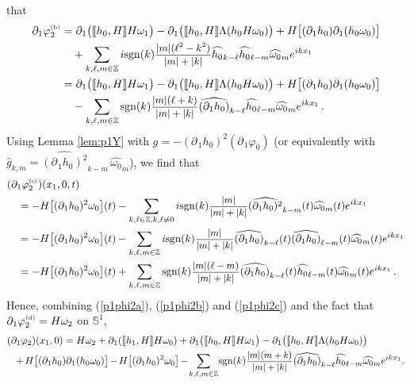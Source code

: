 \documentclass[11pt]{article}
\theoremstyle{plain}
\theoremstyle{definition}
\theoremstyle{definition}
\def\bbZ{{\mathbb Z}}
\def\p{\text{\bf\emph{p}}}
\def\ft #1{{\widehat{#1}}}
\def\p{{\partial\hspace{1pt}}}
\def\comm#1#2{{\llbracket#1,#2\rrbracket}}
\def\smallexp#1{{\text{\small #1}}}
\def\dfrac#1#2{\smallexp{$\displaystyle{}\frac{#1}{#2}$}}
\begin{document}
 that
\begin{align}
\p_{\!1} \varphi_2^{\text{\tiny(b)}} &= \p_{\!1} \big(\comm{h_0}{H} H\omega_1\big) - \p_{\!1} \big(\comm{h_0}{H} \Lambda (h_0 H \omega_0)\big) + H \big[(\p_{\!1} h_0) \p_{\!1}(h_0 \omega_0)\big] \nonumber\\
&\quad + \sum_{k,\ell,m\in\bbZ} i \text{sgn}(k) \dfrac{|m| (\ell^2 - k^2)}{|m|+|k|} \ft{h_0}_{k-\ell} \ft{h_0}_{\ell-m} \ft{\omega_0}_m e^{ikx_1} \nonumber\\
&= \p_{\!1} \big(\comm{h_0}{H} H\omega_1\big) - \p_{\!1} \big(\comm{h_0}{H} \Lambda (h_0 H \omega_0)\big) + H \big[(\p_{\!1} h_0) \p_{\!1}(h_0 \omega_0)\big] \nonumber\\
&\quad - \sum_{k,\ell,m\in\bbZ} \text{sgn}(k) \dfrac{|m| (\ell+k)}{|m|+|k|} \ft{(\p_{\!1} h_0)}_{k-\ell} \ft{h_0}_{\ell-m} \ft{\omega_0}_m e^{ikx_1} \,. \label{p1phi2b}
\end{align}
Using Lemma \ref{lem:p1Y} with $g = - (\p_{\!1} h_0)^2(\p_{\!1}\varphi_0)$ (or equivalently with  $\ft{g}_{k,m} = \ft{(\p_{\!1}h_0)^2}_{k-m}\, \ft{\omega_0}_m$), we find that
\begin{align}
& (\p_{\!1} \varphi_2^{\text{\tiny(c)}})(x_1,0,t) \nonumber\\
&\quad = - H \big[(\p_{\!1}h_0)^2 \omega_0\big](t) - \sum_{k,\ell\in\bbZ, k,\ell\ne 0} i \text{\rm sgn}(k) \dfrac{|m|}{|m|+|k|} \ft{(\p_{\!1}h_0)^2}_{k-m}(t) \ft{\omega_0}_m(t) e^{ikx_1} \nonumber\\
&\quad = - H \big[(\p_{\!1}h_0)^2 \omega_0\big](t) - \sum_{k,\ell,m\in\bbZ} i \text{\rm sgn}(k) \dfrac{|m|}{|m|+|k|} \ft{(\p_{\!1}h_0)}_{k-\ell}(t) \ft{(\p_{\!1}h_0)}_{\ell-m}(t) \ft{\omega_0}_m(t) e^{ikx_1} \nonumber\\
&\quad = - H \big[(\p_{\!1}h_0)^2 \omega_0\big](t) + \sum_{k,\ell,m\in\bbZ} \text{\rm sgn}(k) \dfrac{|m|(\ell-m)}{|m|+|k|} \ft{(\p_{\!1} h_0)}_{k-\ell}(t) \ft{h_0}_{\ell-m}(t) \ft{\omega_0}_m(t) e^{ikx_1} \,. \label{p1phi2c}
\end{align}
Hence, combining (\ref{p1phi2a}), (\ref{p1phi2b}) and (\ref{p1phi2c}) and the fact that $\p_{\!1} \varphi_2^{\text{\tiny(d)}} = H\omega_2$ on $\mathbb{S}^1$,
\begin{align*}
& (\p_{\!1} \varphi_2)(x_1,0) = H \omega_2 + \p_{\!1} (\comm{h_1}{H} H \omega_0) + \p_{\!1} \big(\comm{h_0}{H} H\omega_1\big) - \p_{\!1} \big(\comm{h_0}{H} \Lambda (h_0 H \omega_0)\big) \\
&\ \ +\hspace{-1pt} H \big[(\p_{\!1} h_0) \p_{\!1}(h_0 \omega_0)\big] \hspace{-1pt}-\hspace{-1pt} H \big[(\p_{\!1}h_0)^2 \omega_0\big] \hspace{-1pt}-\hspace{-1.5pt} \sum_{k,\ell,m\in\bbZ} \!\text{\rm sgn}(k) \dfrac{|m|(m+k)}{|m|+|k|} \ft{(\p_{\!1} h_0)}_{k-\ell} \ft{h_0}_{\ell-m} \ft{\omega_0}_m e^{ikx_1} .
\end{align*}
\end{document}
